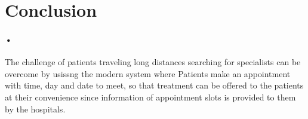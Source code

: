\documentclass[12pt]{article}
\begin{document}
\section{Conclusion}
\paragraph{•} The challenge of patients traveling long distances searching for specialists can be overcome by usissng the modern system where Patients make an appointment with time, day and date to meet, so that treatment can be offered to the patients at their convenience since information of appointment slots is provided to them by the hospitals.
\end{document}
